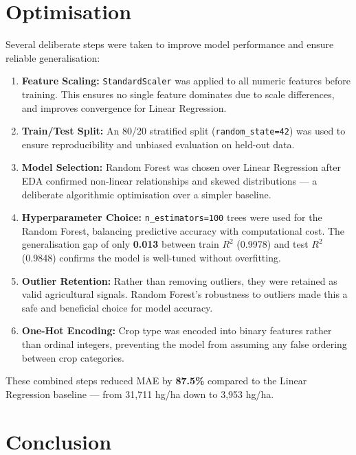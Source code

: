 \documentclass[12pt,a4paper]{article}
\newenvironment{insightbox}[1][Insight]{%
  \begin{mdframed}[linecolor=accent,linewidth=0.8pt,
    backgroundcolor=lightblue!25,
    innertopmargin=7pt,innerbottommargin=7pt,
    innerleftmargin=10pt,innerrightmargin=10pt,
    frametitle={\small\bfseries\color{white}\,#1},
    frametitlebackgroundcolor=accent,frametitlerule=false,
    frametitleaboveskip=3pt,frametitlebelowskip=3pt]\small
}{\end{mdframed}}
\begin{document}
\section{Optimisation}

Several deliberate steps were taken to improve model performance and ensure
reliable generalisation:

\begin{enumerate}[label=\textbf{\arabic*.}, leftmargin=2.5em]
  \item \textbf{Feature Scaling:} \texttt{StandardScaler} was applied to all
        numeric features before training. This ensures no single feature
        dominates due to scale differences, and improves convergence for
        Linear Regression.
  \item \textbf{Train/Test Split:} An 80/20 stratified split
        (\texttt{random\_state=42}) was used to ensure reproducibility and
        unbiased evaluation on held-out data.
  \item \textbf{Model Selection:} Random Forest was chosen over Linear
        Regression after EDA confirmed non-linear relationships and skewed
        distributions --- a deliberate algorithmic optimisation over a simpler
        baseline.
  \item \textbf{Hyperparameter Choice:} \texttt{n\_estimators=100} trees were
        used for the Random Forest, balancing predictive accuracy with
        computational cost. The generalisation gap of only \textbf{0.013}
        between train $R^2$ (0.9978) and test $R^2$ (0.9848) confirms the
        model is well-tuned without overfitting.
  \item \textbf{Outlier Retention:} Rather than removing outliers, they were
        retained as valid agricultural signals. Random Forest's robustness to
        outliers made this a safe and beneficial choice for model accuracy.
  \item \textbf{One-Hot Encoding:} Crop type was encoded into binary features
        rather than ordinal integers, preventing the model from assuming any
        false ordering between crop categories.
\end{enumerate}

\begin{insightbox}[Optimisation Result]
These combined steps reduced MAE by \textbf{87.5\%} compared to the Linear
Regression baseline --- from 31,711 hg/ha down to 3,953 hg/ha.
\end{insightbox}

\section{Conclusion}
\end{document}

